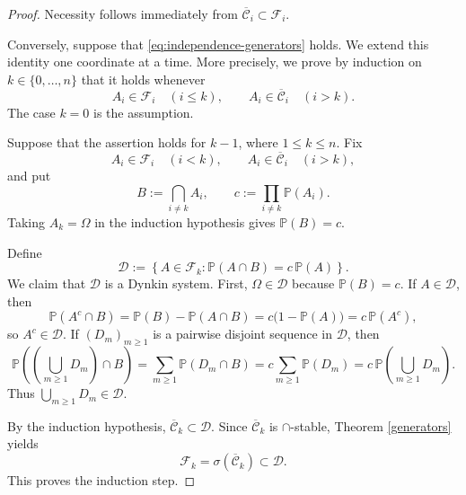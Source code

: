 \documentclass[11pt, a4paper, openany]{book}
\theoremstyle{definition}
\begin{document}
    \begin{proof}
        Necessity follows immediately from
        $\overline{\mathscr{C}}_i\subset\mathscr{F}_i$.
    
        Conversely, suppose that \eqref{eq:independence-generators}
        holds. We extend this identity one coordinate at a time.
        More precisely, we prove by induction on $k\in\{0,\dots,n\}$
        that it holds whenever
        \[
            A_i\in\mathscr{F}_i\quad (i\leqslant k),
            \qquad
            A_i\in\overline{\mathscr{C}}_i\quad (i>k).
        \]
        The case $k=0$ is the assumption.
    
        Suppose that the assertion holds for $k-1$, where
        $1\leqslant k\leqslant n$. Fix
        \[
            A_i\in\mathscr{F}_i\quad (i<k),
            \qquad
            A_i\in\overline{\mathscr{C}}_i\quad (i>k),
        \]
        and put
        \[
            B:=\bigcap_{i\neq k}A_i,
            \qquad
            c:=\prod_{i\neq k}\mathbb{P}(A_i).
        \]
        Taking $A_k=\Omega$ in the induction hypothesis gives
        $\mathbb{P}(B)=c$.
    
        Define
        \[
            \mathscr{D}
            :=
            \left\{
                A\in\mathscr{F}_k:
                \mathbb{P}(A\cap B)=c\,\mathbb{P}(A)
            \right\}.
        \]
        We claim that $\mathscr{D}$ is a Dynkin system.
        First, $\Omega\in\mathscr{D}$ because $\mathbb{P}(B)=c$.
        If $A\in\mathscr{D}$, then
        \[
            \mathbb{P}(A^c\cap B)
            =
            \mathbb{P}(B)-\mathbb{P}(A\cap B)
            =
            c\bigl(1-\mathbb{P}(A)\bigr)
            =
            c\,\mathbb{P}(A^c),
        \]
        so $A^c\in\mathscr{D}$.
        If $(D_m)_{m\geqslant1}$ is a pairwise disjoint sequence
        in $\mathscr{D}$, then
        \[
            \mathbb{P}\left(
                \left(\bigcup_{m\geqslant1}D_m\right)\cap B
            \right)
            =
            \sum_{m\geqslant1}\mathbb{P}(D_m\cap B)
            =
            c\sum_{m\geqslant1}\mathbb{P}(D_m)
            =
            c\,\mathbb{P}\left(\bigcup_{m\geqslant1}D_m\right).
        \]
        Thus $\bigcup_{m\geqslant1}D_m\in\mathscr{D}$.
    
        By the induction hypothesis,
        $\overline{\mathscr{C}}_k\subset\mathscr{D}$.
        Since $\overline{\mathscr{C}}_k$ is $\cap$-stable,
        Theorem \ref{generators} yields
        \[
            \mathscr{F}_k
            =
            \sigma(\overline{\mathscr{C}}_k)
            \subset\mathscr{D}.
        \]
        This proves the induction step.
    

\end{proof}
\end{document}
